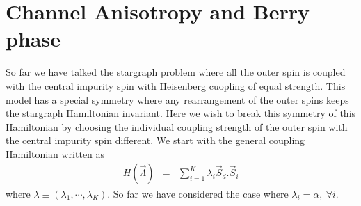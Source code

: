 \documentclass[reprint,prb,superscriptaddress]{revtex4-1}
\begin{document}
\section{Channel Anisotropy and Berry phase}
\noindent So far we have talked the stargraph problem where all the outer spin is coupled with the central impurity spin with Heisenberg cuopling of equal strength. This model has a special symmetry where any rearrangement of the outer spins keeps the stargraph Hamiltonian invariant. Here we wish to break this symmetry of this Hamiltonian by choosing the individual coupling strength of the outer spin with the central impurity spin different. We start with the general coupling Hamiltonian written as 
\begin{eqnarray}
H (\vec{\Lambda}) &=& \sum_{i=1}^{K} \lambda_i\vec{S}_d.\vec{S}_i
\end{eqnarray}
where $\lambda \equiv (\lambda_1,\cdots,\lambda_K)$. So far we have considered the case where $\lambda_i=\alpha,~\forall i$. 
\end{document}
